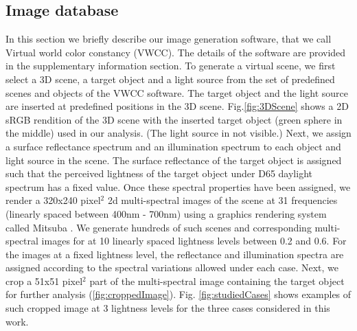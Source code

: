 \documentclass{jov}
\begin{document}
\subsection{Image database} \label{method:VirtualWorld}
In this section we briefly describe our image generation software, that we call Virtual world color constancy (VWCC). The details of the software are provided in the supplementary information section. To generate a virtual scene, we first select a 3D scene, a target object and a light source from the set of predefined scenes and objects of the VWCC software. The target object and the light source are inserted at predefined positions in the 3D scene. Fig.\ref{fig:3DScene} shows a 2D sRGB rendition of the 3D scene with the inserted target object (green sphere in the middle) used in our analysis. (The light source in not visible.) Next, we assign a surface reflectance spectrum and an illumination spectrum to each object and light source in the scene. The surface reflectance of the target object is assigned such that the perceived lightness of the target object under D65 daylight spectrum has a fixed value. Once these spectral properties have been assigned, we render a 320x240 pixel$^2$ 2d multi-spectral images of the scene at 31 frequencies (linearly spaced between 400nm - 700nm) using a graphics rendering system called Mitsuba \cite{jakob2015mitsuba}. We generate hundreds of such scenes and corresponding multi-spectral images for at 10 linearly spaced lightness levels between 0.2 and 0.6. For the images at a fixed lightness level, the reflectance and illumination spectra are assigned according to the spectral variations allowed under each case. Next, we crop a 51x51 pixel$^2$ part of the multi-spectral image containing the target object for further analysis (\ref{fig:croppedImage}). Fig. \ref{fig:studiedCases} shows examples of such cropped image at 3 lightness levels for the three cases considered in this work.
\end{document}
